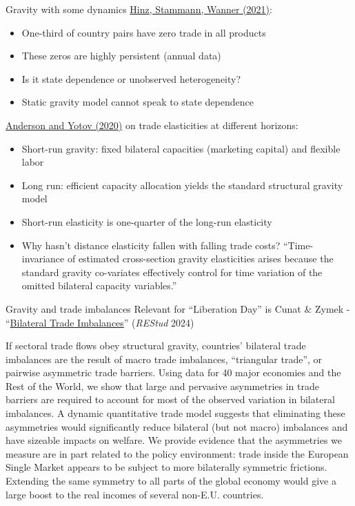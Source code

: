 \documentclass[10pt,notes=hide,aspectratio=169]{beamer}
\begin{document}
\begin{frame}{Gravity with some dynamics}
\href{https://arxiv.org/abs/2004.12655}{Hinz, Stammann, Wanner (2021)}:
\begin{itemize}
\item One-third of country pairs have zero trade in all products
\item These zeros are highly persistent (annual data)
\item Is it state dependence or unobserved heterogeneity?
\item Static gravity model cannot speak to state dependence
\end{itemize}
\medskip
\href{https://doi.org/10.1016/j.jinteco.2020.103341}{Anderson and Yotov (2020)} on trade elasticities at different horizons:
\begin{itemize}
\item Short-run gravity: fixed bilateral capacities (marketing capital) and flexible labor
\item Long run: efficient capacity allocation yields the standard structural gravity model
\item Short-run elasticity is one-quarter of the long-run elasticity
\item Why hasn't distance elasticity fallen with falling trade costs? ``Time-invariance of estimated cross-section gravity elasticities arises because the standard gravity co-variates effectively control for time variation of the omitted bilateral capacity variables.''
\end{itemize}
\end{frame}
\begin{frame}{Gravity and trade imbalances}
Relevant for ``Liberation Day'' is
Cunat \& Zymek - ``\href{https://doi.org/10.1093/restud/rdad052}{Bilateral Trade Imbalances}'' (\textit{REStud} 2024)
{\small
	If sectoral trade flows obey structural gravity, countries' bilateral trade imbalances are the result of macro trade imbalances, “triangular trade”, or pairwise asymmetric trade barriers. Using data for 40 major economies and the Rest of the World, we show that large and pervasive asymmetries in trade barriers are required to account for most of the observed variation in bilateral imbalances. A dynamic quantitative trade model suggests that eliminating these asymmetries would significantly reduce bilateral (but not macro) imbalances and have sizeable impacts on welfare. We provide evidence that the asymmetries we measure are in part related to the policy environment: trade inside the European Single Market appears to be subject to more bilaterally symmetric frictions. Extending the same symmetry to all parts of the global economy would give a large boost to the real incomes of several non-E.U. countries.
\par}
\end{frame}
\end{document}
